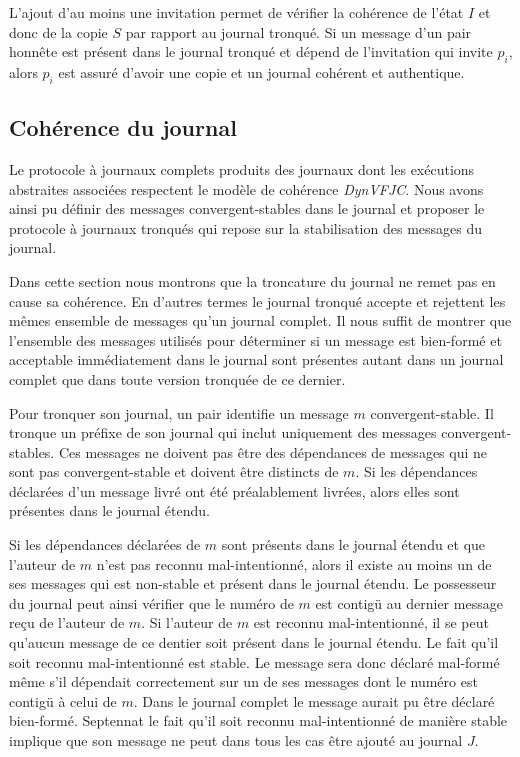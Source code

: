 L'ajout d'au moins une invitation permet de vérifier la cohérence de l'état $I$ et donc de la copie $S$ par rapport au journal tronqué.
Si un message d'un pair honnête est présent dans le journal tronqué et dépend de l'invitation qui invite $p_i$, alors $p_i$ est assuré d'avoir une copie et un journal cohérent et authentique.


\subsection{Cohérence du journal}

Le protocole à journaux complets produits des journaux dont les exécutions abstraites associées respectent le modèle de cohérence \emph{DynVFJC}.
Nous avons ainsi pu définir des messages convergent-stables dans le journal et proposer le protocole à journaux tronqués qui repose sur la stabilisation des messages du journal.

Dans cette section nous montrons que la troncature du journal ne remet pas en cause sa cohérence.
En d'autres termes le journal tronqué accepte et rejettent les mêmes ensemble de messages qu'un journal complet.
Il nous suffit de montrer que l'ensemble des messages utilisés pour déterminer si un message est bien-formé et acceptable immédiatement dans le journal sont présentes autant dans un journal complet que dans toute version tronquée de ce dernier.

Pour tronquer son journal, un pair identifie un message $m$ convergent-stable.
Il tronque un préfixe de son journal qui inclut uniquement des messages convergent-stables.
Ces messages ne doivent pas être des dépendances de messages qui ne sont pas convergent-stable et doivent être distincts de $m$.
Si les dépendances déclarées d'un message livré ont été préalablement livrées, alors elles sont présentes dans le journal étendu.

Si les dépendances déclarées de $m$ sont présents dans le journal étendu et que l'auteur de $m$ n'est pas reconnu mal-intentionné, alors il existe au moins un de ses messages qui est non-stable et présent dans le journal étendu.
Le possesseur du journal peut ainsi vérifier que le numéro de $m$ est contigü au dernier message reçu de l'auteur de $m$.
Si l'auteur de $m$ est reconnu mal-intentionné, il se peut qu'aucun message de ce dentier soit présent dans le journal étendu.
Le fait qu'il soit reconnu mal-intentionné est stable.
Le message sera donc déclaré mal-formé même s'il dépendait correctement sur un de ses messages dont le numéro est contigü à celui de $m$.
Dans le journal complet le message aurait pu être déclaré bien-formé.
Septennat le fait qu'il soit reconnu mal-intentionné de manière stable implique que son message ne peut dans tous les cas être ajouté au journal $J$.

